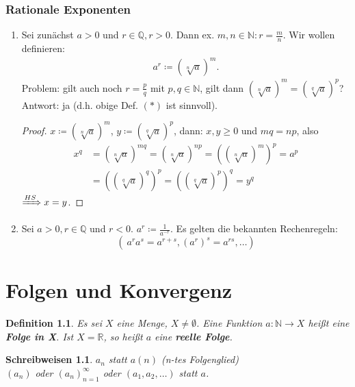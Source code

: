 \documentclass[12pt]{extreport} %
\newcommand{\N}{\mathbb{N}}
\newcommand{\Q}{\mathbb{Q}}
\newcommand{\R}{\mathbb{R}}
\theoremstyle{named}
\theoremstyle{dotless}
\newtheorem*{definition}{Definition}
\newtheorem*{schreibweisen}{Schreibweisen}
\begin{document}
\subsection*{Rationale Exponenten}
\begin{enumerate}
	\item Sei zunächst $a > 0$ und $r \in \Q, r > 0$. Dann ex. $m, n \in \N : r = \frac{m}{n}$. Wir wollen definieren:
		\begin{align}
			a^{r} \coloneqq \left( \sqrt[n]{a} \right)^{m} \tag{$*$}.			
		\end{align}
		Problem: gilt auch noch $r = \frac{p}{q}$ mit $p, q \in \N$, gilt dann $\left( \sqrt[n]{a} \right)^{m} = \left( \sqrt[q]{a} \right)^{p}$? \\
		Antwort: ja (d.h. obige Def. $(*)$ ist sinnvoll).
		\begin{proof}
			$x \coloneqq \left( \sqrt[n]{a} \right)^{m}$, $y \coloneqq \left( \sqrt[q]{a} \right)^{p}$, dann: $x, y \geq 0$ und $mq = np$, also
			\begin{align*}
				x^{q} & = \left( \sqrt[n]{a} \right)^{mq} = \left( \sqrt[n]{a} \right)^{np} = \left(  \left( \sqrt[n]{a} \right)^{m}\right)^{p} = a^{p} \\
					  & = \left( \left( \sqrt[q]{a} \right)^{q}\right)^{p} = \left( \left( \sqrt[q]{a} \right)^{p}\right)^{q} = y^{q}
			\end{align*}
			$\xRightarrow[]{HS} x = y$.  
		\end{proof}
	\item Sei $a > 0, r \in \Q$ und $r < 0$. $a^{r} \coloneqq \frac{1}{a^{-r}}$. Es gelten die bekannten Rechenregeln:
		$$
			\left( ~ a^{r} a^{s} = a^{r + s}, \left( a^{r} \right)^{s} = a^{rs}, \dotsc \right)
		$$
\end{enumerate}


\newpage


\chapter{Folgen und Konvergenz}

\begin{definition}
	Es sei $X$ eine Menge, $X \neq \emptyset$. Eine Funktion $a \colon \N \to X$ hei{\ss}t eine \textbf{Folge in X}. Ist $X = \R$, so hei{\ss}t $a$ eine \textbf{reelle Folge}.
\end{definition}


\begin{schreibweisen}
$a_{n}$ statt $a(n)$ (n-tes Folgenglied) \\
$(a_{n})$ oder $(a_{n})_{n = 1}^{\infty}$ oder $(a_{1}, a_{2}, \dotsc)$ statt $a$.
\end{schreibweisen}
\end{document}
